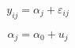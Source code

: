 \documentclass[a4paper,twoside,12pt,german]{article}
\begin{document}
\begin{equation}
y_{ij} = \alpha_{j} + \varepsilon_{ij}
\end{equation}

\begin{equation}
\alpha_{j} = \alpha_0 + u_{j}
\end{equation}
\end{document}
